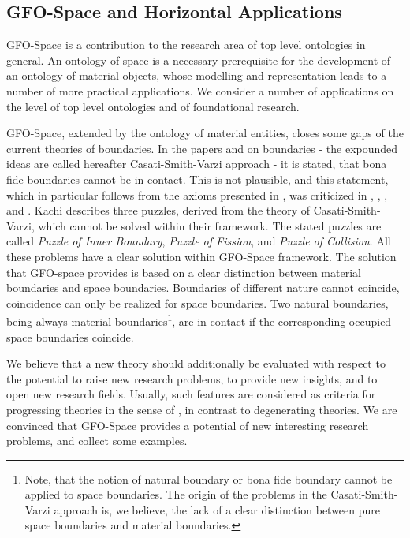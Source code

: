 \documentclass{ao2e}
\begin{document}
{\subsection{GFO-Space and Horizontal Applications}
GFO-Space is a contribution to the research area of top level ontologies in general. An ontology of space is a necessary prerequisite for the development of an ontology of material objects, whose modelling and representation leads to a number of more practical applications. We consider a number of applications on the level of top level ontologies and of foundational research.

GFO-Space, extended by the ontology of material entities, closes some gaps of the current theories of boundaries. In the papers \cite{smith-b-2000-a} and \cite{casati-r-1999-b} on boundaries - the expounded ideas are called hereafter Casati-Smith-Varzi approach - it is stated, that bona fide boundaries cannot be in contact. This is not plausible, and this statement, which in particular follows from the axioms presented in \cite{smith-b-2000-a},  was criticized in \cite{heller-b-2004-a}, \cite{herre-h-2007-a}, \cite{herre-h-2010-a}, \cite{ridder-l-2002-a} and \cite{kachi-d-2009-a}. Kachi describes 
three puzzles, derived from the theory of Casati-Smith-Varzi, which cannot be solved within their framework. The stated puzzles are called {\it Puzzle of Inner Boundary}, {\it Puzzle of Fission}, and {\it Puzzle of Collision}. 
All these problems have a clear solution within GFO-Space framework.
The solution that GFO-space provides is based on a clear distinction between material boundaries and space boundaries. Boundaries of different nature cannot coincide, coincidence can only be realized for space boundaries. Two natural boundaries, being always material boundaries\footnote{Note, that the notion of natural boundary or bona fide boundary cannot be applied to space boundaries. The origin of the problems in the Casati-Smith-Varzi approach is, we believe,  the lack of a clear distinction between pure space boundaries and material boundaries.}, are in contact if the corresponding occupied space boundaries coincide.

We believe that a new theory should additionally be evaluated  with respect to the potential to raise new research problems, to provide new insights, and to open new research fields. Usually, such features are considered as criteria for progressing theories in the sense of \cite{lakatos-i-1976-a}, in contrast to degenerating theories.
We are convinced that GFO-Space provides a potential of new interesting research problems, and collect some examples.

}
\end{document}
